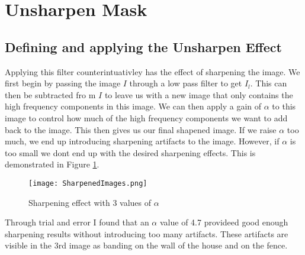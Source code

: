 \section{Unsharpen Mask}
\subsection{Defining and applying the Unsharpen Effect}
Applying this filter counterintuativley has the effect of sharpening the image. We first begin by passing the image $I$ through a low pass filter to get $I_l$. This can then be subtracted fro m $I$ to leave us with a new image that only contains the high frequency components in this image. We can then apply a gain of $\alpha$ to this image to control how much of the high frequency components we want to add back to the image. This then gives us our final shapened image. If we raise $\alpha$ too much, we end up introducing sharpening artifacts to the image. However, if $\alpha$ is too small we dont end up with the desired sharpening effects. This is demonstrated in Figure \ref{fig:SharpenedImages}.

\begin{figure}[!h]
    \texttt{[image: SharpenedImages.png]}
    \centering
    \caption{Sharpening effect with 3 values of $\alpha$}
    \label{fig:SharpenedImages}
\end{figure}

\noindent Through trial and error I found that an $\alpha$ value of 4.7 provideed good enough sharpening results without introducing too many artifacts. These artifacts are visible in the 3rd image as banding on the wall of the house and on the fence.